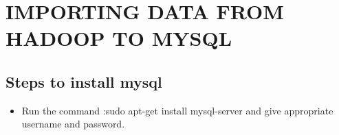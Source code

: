 \documentclass[letterpaper,10pt,english]{sphinxmanual}
\begin{document}
\chapter{IMPORTING DATA FROM HADOOP TO MYSQL}
\label{importdata:importing-data-from-hadoop-to-mysql}\label{importdata::doc}

\section{Steps to install mysql}
\label{importdata:steps-to-install-mysql}\begin{itemize}
\item {} 
Run the command :sudo apt-get install mysql-server and give appropriate username and password.

\end{itemize}
\end{document}
